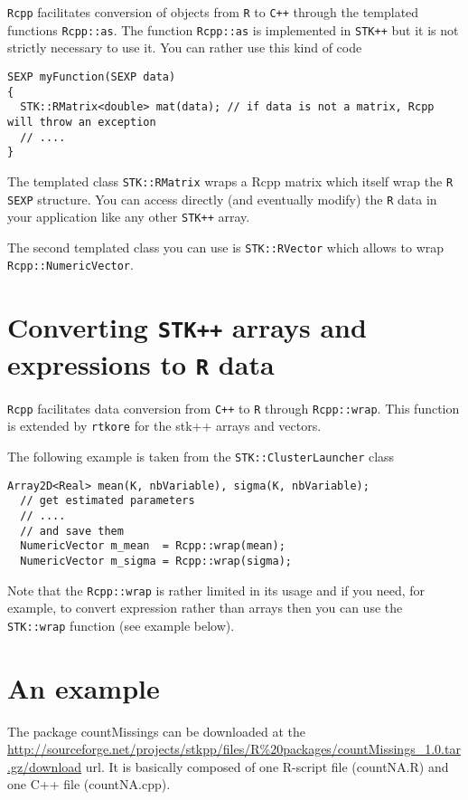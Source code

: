 \documentclass[a4paper,10pt]{article}
\newcommand{\rtkore}{{\tt rtkore}} %
\newcommand{\stkpp}{{\tt STK++}} %
\begin{document}
\texttt{Rcpp} facilitates conversion of objects from \texttt{R} to
\texttt{C++} through the templated functions \texttt{Rcpp::as}.
The function \texttt{Rcpp::as} is implemented in \stkpp{} but
it is not strictly necessary to use it. You can rather use this kind
of code
\begin{lstlisting}[style=customcpp]
SEXP myFunction(SEXP data)
{
  STK::RMatrix<double> mat(data); // if data is not a matrix, Rcpp will throw an exception
  // ....
}
\end{lstlisting}
The templated class \texttt{STK::RMatrix} wraps a Rcpp matrix which itself
wrap the \texttt{R} \verb+SEXP+ structure. You can access directly (and
eventually modify) the \texttt{R} data in your application like any other
\texttt{STK++} array.

The second templated class you can use is \texttt{STK::RVector} which
allows to wrap \texttt{Rcpp::NumericVector}.

\section{Converting \stkpp{} arrays and expressions to \texttt{R} data}

\texttt{Rcpp} facilitates data conversion from \texttt{C++} to \texttt{R}
through  \texttt{Rcpp::wrap}. This function is extended by \rtkore{} for the stk++
arrays and vectors.

The following example is taken from the \texttt{STK::ClusterLauncher} class
\begin{lstlisting}[style=customcpp]
  Array2D<Real> mean(K, nbVariable), sigma(K, nbVariable);
  // get estimated parameters
  // ....
  // and save them
  NumericVector m_mean  = Rcpp::wrap(mean);
  NumericVector m_sigma = Rcpp::wrap(sigma);
\end{lstlisting}

Note that the \texttt{Rcpp::wrap} is rather limited in its usage and if you
need, for example, to convert expression rather than arrays then you can use the
\texttt{STK::wrap} function (see example below).

\section{An example}

The package countMissings can be downloaded at the
\url{http://sourceforge.net/projects/stkpp/files/R%20packages/countMissings_1.0.tar.gz/download}
url. It is basically composed of one R-script file (countNA.R) and one C++ file
(countNA.cpp).
\end{document}
